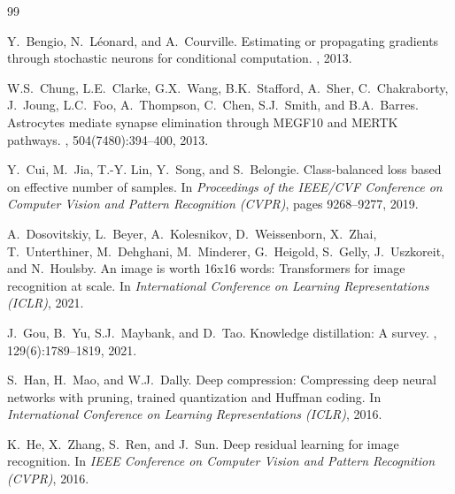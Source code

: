 \documentclass[11pt, a4paper]{article}
\begin{document}

\begin{thebibliography}{99}

Y.~Bengio, N.~L{\'e}onard, and A.~Courville.
\newblock Estimating or propagating gradients through stochastic neurons for conditional computation.
, 2013.


W.S.~Chung, L.E.~Clarke, G.X.~Wang, B.K.~Stafford, A.~Sher, C.~Chakraborty, J.~Joung, L.C.~Foo, A.~Thompson, C.~Chen, S.J.~Smith, and B.A.~Barres.
\newblock Astrocytes mediate synapse elimination through MEGF10 and MERTK pathways.
, 504(7480):394--400, 2013.

Y.~Cui, M.~Jia, T.-Y. Lin, Y.~Song, and S.~Belongie.
\newblock Class-balanced loss based on effective number of samples.
\newblock In {\em Proceedings of the IEEE/CVF Conference on Computer Vision and Pattern Recognition (CVPR)}, pages 9268--9277, 2019.


A.~Dosovitskiy, L.~Beyer, A.~Kolesnikov, D.~Weissenborn, X.~Zhai, T.~Unterthiner, M.~Dehghani, M.~Minderer, G.~Heigold, S.~Gelly, J.~Uszkoreit, and N.~Houlsby.
\newblock An image is worth 16x16 words: Transformers for image recognition at scale.
\newblock In {\em International Conference on Learning Representations (ICLR)}, 2021.

J.~Gou, B.~Yu, S.J.~Maybank, and D.~Tao.
\newblock Knowledge distillation: A survey.
, 129(6):1789--1819, 2021.

S.~Han, H.~Mao, and W.J.~Dally.
\newblock Deep compression: Compressing deep neural networks with pruning, trained quantization and Huffman coding.
\newblock In {\em International Conference on Learning Representations (ICLR)}, 2016.

K.~He, X.~Zhang, S.~Ren, and J.~Sun.
\newblock Deep residual learning for image recognition.
\newblock In {\em IEEE Conference on Computer Vision and Pattern Recognition (CVPR)}, 2016.


\end{thebibliography}
\end{document}

